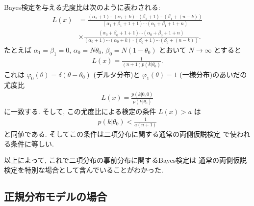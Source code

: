 \documentclass[12pt,twoside]{jarticle}
\theoremstyle{jplain}
\theoremstyle{jplain}
\theoremstyle{jplain}
\numberwithin{theorem}{section}
\numberwithin{equation}{section}
\numberwithin{figure}{section}
\numberwithin{table}{section}
\begin{document}
Bayes検定を与える尤度比は次のように表わされる:
\begin{align*}
  L(x)
  & =
  \frac
  {(\alpha_1+1)\cdots(\alpha_1+k)\cdot(\beta_1+1)\cdots(\beta_1+(n-k))}
  {(\alpha_1+\beta_1+1+1)\cdots(\alpha_1+\beta_1+1+n)}
  \\&
  \times\frac
  {(\alpha_0+\beta_0+1+1)\cdots(\alpha_0+\beta_0+1+n)}
  {(\alpha_0+1)\cdots(\alpha_0+k)\cdot(\beta_0+1)\cdots(\beta_0+(n-k))}.
\end{align*}
たとえば $\alpha_1=\beta_1=0$,
$\alpha_0=N\theta_0$, $\beta_0=N(1-\theta_0)$
とおいて $N\to\infty$ とすると
\begin{align*}
  L(x) = \frac{1}{(n+1)p(k|\theta_0)}.
\end{align*}
これは $\varphi_0(\theta)=\delta(\theta-\theta_0)$ (デルタ分布)と
$\varphi_1(\theta)=1$ (一様分布)のあいだの尤度比
\begin{align*}
  L(x) = \frac{p(k|0,0)}{p(k|\theta_0)}
\end{align*}
に一致する. そして, この尤度比による検定の条件 $L(x)>a$ は
\begin{align*}
  p(k|\theta_0) < \frac{1}{a(n+1)}
\end{align*}
と同値である. そしてこの条件は二項分布に関する通常の両側仮説検定
で使われる条件に等しい.

以上によって, これで二項分布の事前分布に関するBayes検定は
通常の両側仮説検定を特別な場合として含んでいることがわかった.

\subsection{正規分布モデルの場合}
\end{document}
